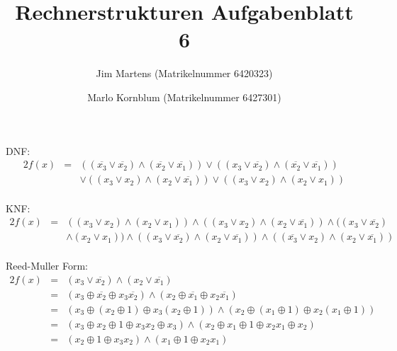 \documentclass[10pt,a4paper,oneside,ngerman,numbers=noenddot]{scrartcl}
\begin{document}
\author{Jim Martens (Matrikelnummer 6420323) \and Marlo Kornblum (Matrikelnummer 6427301)}
\title{Rechnerstrukturen Aufgabenblatt 6}
\maketitle

\section{} %
\subsection{} %
DNF:\\
\begin{alignat*}{2}
f(x) &=& ((\overline{x_{3}} \vee \overline{x_{2}}) \wedge (\overline{x_{2}} \vee \overline{x_{1}}))\vee ((x_{3} \vee \overline{x_{2}}) \wedge (\overline{x_{2}} \vee \overline{x_{1}})) \\
&& \vee ((x_{3} \vee x_{2}) \wedge (x_{2} \vee \overline{x_{1}})) \vee ((x_{3} \vee x_{2}) \wedge (x_{2} \vee x_{1}))
\end{alignat*}\\
KNF:\\
\begin{alignat*}{2}
f(x) &=& ((x_{3} \vee x_{2}) \wedge (x_{2} \vee x_{1})) \wedge ((x_{3} \vee x_{2}) \wedge (x_{2} \vee \overline{x_{1}})) \wedge ((x_{3} \vee \overline{x_{2}}) \\
&& \wedge (x_{2} \vee x_{1})) \wedge ((x_{3} \vee \overline{x_{2}}) \wedge (x_{2} \vee \overline{x_{1}})) \wedge ((\overline{x_{3}} \vee x_{2}) \wedge (x_{2} \vee \overline{x_{1}}))
\end{alignat*}\\
Reed-Muller Form:\\
\begin{alignat*}{2}
f(x) &=& (x_{3} \vee \overline{x_{2}}) \wedge (x_{2} \vee \overline{x_{1}}) \\
&=& (x_{3} \oplus \overline{x_{2}} \oplus x_{3}\overline{x_{2}}) \wedge (x_{2} \oplus \overline{x_{1}} \oplus x_{2}\overline{x_{1}}) \\
&=& (x_{3} \oplus (x_{2} \oplus 1) \oplus x_{3}(x_{2} \oplus 1)) \wedge (x_{2} \oplus (x_{1} \oplus 1) \oplus x_{2}(x_{1} \oplus 1)) \\
&=& (x_{3} \oplus x_{2} \oplus 1 \oplus x_{3}x_{2} \oplus x_{3}) \wedge (x_{2} \oplus x_{1} \oplus 1 \oplus x_{2}x_{1} \oplus x_{2}) \\
&=& (x_{2} \oplus 1 \oplus x_{3}x_{2}) \wedge (x_{1} \oplus 1 \oplus x_{2}x_{1})
\end{alignat*}
\end{document}
